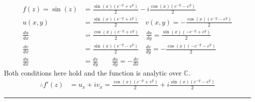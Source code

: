 \documentclass{article}
\newcommand{\der}[2]{\frac{d#1}{d#2}}
\begin{document}
\begin{align*}
  f(z) = \sin{(z)} &= \frac{\sin{(x)}(e^{-y}+ e^{y})}{2} -i\frac{\cos{(x)}(e^{-y} - e^{y})}{2} \\
  u(x,y) &= \frac{\sin{(x)}(e^{-y}+ e^{y})}{2} \quad v(x,y) = -\frac{\cos{(x)}(e^{-y} - e^{y})}{2}\\
  \der{u}{x} &= \frac{\cos{(x)}(e^{-y} + e^{y})}{2} \quad \der{u}{y}= \frac{\sin{(x)}(-e^{-y} + e^{y})}{2} \\
  \der{v}{x} &= \frac{\sin{(x)}(e^{-y}- e^{y})}{2} \quad \der{v}{y} = -\frac{\cos{(x)}(-e^{-y}- e^{y})}{2} \\
  \der{u}{x} &= \der{v}{y} \quad \quad \der{u}{y} = -\der{v}{x}
\end{align*}
Both conditions here hold and the function is analytic over $\mathbb{C}$.
\begin{align*}
  \therefore f'(z) &= u_x + iv_x =  \frac{\cos{(x)}(e^{-y} + e^{y})}{2} + i\frac{\sin{(x)}(e^{-y}- e^{y})}{2}
\end{align*}

\vspace{.5cm} %

\hrule

\end{document}
